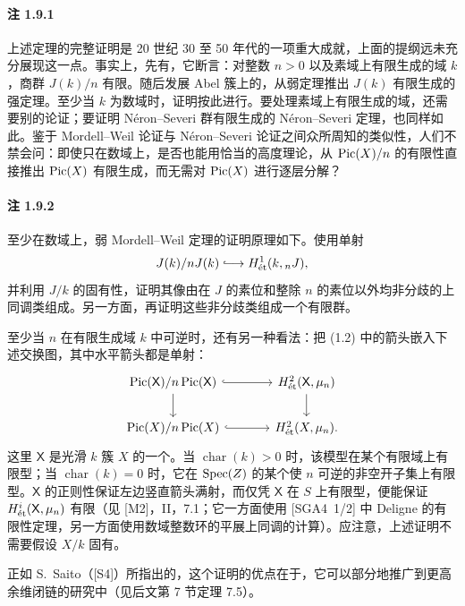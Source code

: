 \paragraph{注 1.9.1}
上述定理的完整证明是 20 世纪 30 至 50 年代的一项重大成就，上面的提纲远未充分展现这一点。事实上，先有，它断言：对整数 $n>0$ 以及素域上有限生成的域 $k$，商群 $J(k)/n$ 有限。随后发展 Abel 簇上的，从弱定理推出 $J(k)$ 有限生成的强定理。至少当 $k$ 为数域时，证明按此进行。要处理素域上有限生成的域，还需要别的论证；要证明 Néron--Severi 群有限生成的 Néron--Severi 定理，也同样如此。鉴于 Mordell--Weil 论证与 Néron--Severi 论证之间众所周知的类似性，人们不禁会问：即使只在数域上，是否也能用恰当的高度理论，从 $\operatorname{Pic}(X)/n$ 的有限性直接推出 $\operatorname{Pic}(X)$ 有限生成，而无需对 $\operatorname{Pic}(X)$ 进行逐层分解？

\paragraph{注 1.9.2}
至少在数域上，弱 Mordell--Weil 定理的证明原理如下。使用单射
\[
J(k)/nJ(k)\lhook\joinrel\longrightarrow H^1_{\et}(k,{}_nJ),
\]
并利用 $J/k$ 的固有性，证明其像由在 $J$ 的素位和整除 $n$ 的素位以外均非分歧的上同调类组成。另一方面，再证明这些非分歧类组成一个有限群。

至少当 $n$ 在有限生成域 $k$ 中可逆时，还有另一种看法：把 (1.2) 中的箭头嵌入下述交换图，其中水平箭头都是单射：
\[
\begin{tikzcd}[ampersand replacement=\&,column sep=large]
\Pic(\mathsf X)/n\Pic(\mathsf X) \arrow[r,hook] \arrow[d] \& H^2_{\et}(\mathsf X,\mu_n) \arrow[d]\\
\Pic(X)/n\Pic(X) \arrow[r,hook] \& H^2_{\et}(X,\mu_n).
\end{tikzcd}
\]
这里 $\mathsf X$ 是光滑 $k$ 簇 $X$ 的一个。当 $\operatorname{char}(k)>0$ 时，该模型在某个有限域上有限型；当 $\operatorname{char}(k)=0$ 时，它在 $\operatorname{Spec}(Z)$ 的某个使 $n$ 可逆的非空开子集上有限型。$\mathsf X$ 的正则性保证左边竖直箭头满射，而仅凭 $\mathsf X$ 在 $S$ 上有限型，便能保证 $H^i_{\mathrm{\acute et}}(\mathsf X,\mu_n)$ 有限（见 [M2]，II，7.1；它一方面使用 [SGA4~1/2] 中 Deligne 的有限性定理，另一方面使用数域整数环的平展上同调的计算）。应注意，上述证明不需要假设 $X/k$ 固有。

正如 S.~Saito（[S4]）所指出的，这个证明的优点在于，它可以部分地推广到更高余维闭链的研究中（见后文第 7 节定理 7.5）。

